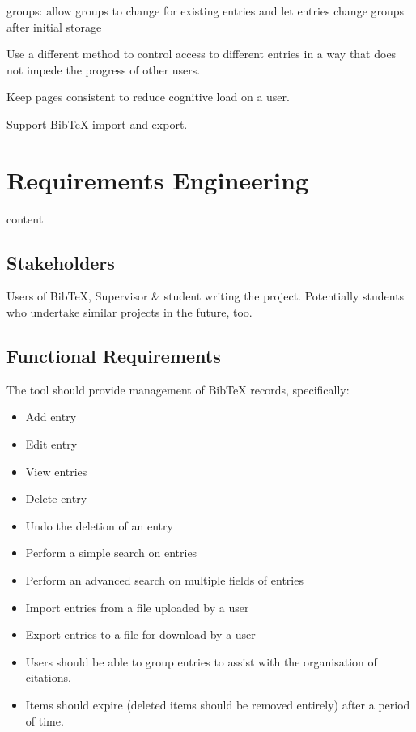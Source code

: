 \documentclass{l4proj}
\newcommand{\BibTeX}{B{\sc ib}\TeX}
\newcommand{\bibtex}{\BibTeX}
\begin{document}
groups: allow groups to change for existing entries and let entries change groups after initial storage

Use a different method to control access to different entries in a way that does not impede the progress of other users.

Keep pages consistent to reduce cognitive load on a user.

Support \bibtex{} import and export.



\chapter{Requirements Engineering}
\label{reqs}
content

\section{Stakeholders}
Users of \bibtex, Supervisor \& student writing the project. Potentially students who undertake similar projects in the future, too.

\section{Functional Requirements}
The tool should provide management of BibTeX records, specifically:
\begin{itemize}
\item Add entry
\item Edit entry
\item View entries
\item Delete entry
\item Undo the deletion of an entry
\item Perform a simple search on entries
\item Perform an advanced search on multiple fields of entries
\item Import entries from a file uploaded by a user
\item Export entries to a file for download by a user
\item Users should be able to group entries to assist with the organisation of citations.
\item Items should expire (deleted items should be removed entirely) after a period of time.
\end{itemize}
\end{document}
